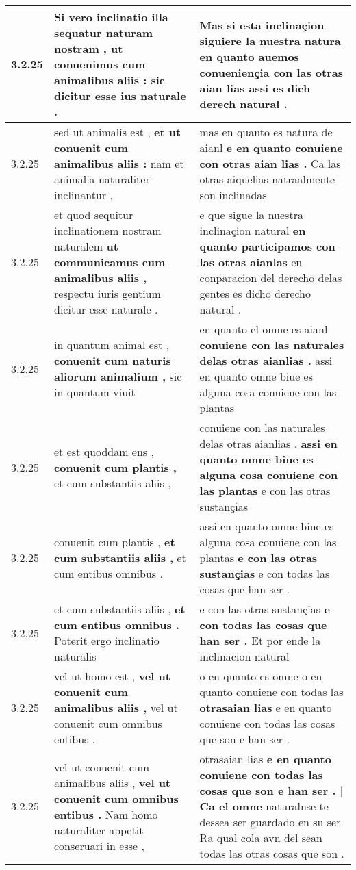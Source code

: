 \begin{tabular}{|p{1cm}|p{6.5cm}|p{6.5cm}|}
3.2.25 & Si vero inclinatio illa sequatur naturam nostram , \textbf{ ut conuenimus cum animalibus aliis : } sic dicitur esse ius naturale . & Mas si esta inclinaçion \textbf{ siguiere la nuestra natura en quanto auemos conueniençia con las otras aian lias } assi es dich derech natural . \\\hline
3.2.25 & sed ut animalis est , \textbf{ et ut conuenit cum animalibus aliis : } nam et animalia naturaliter inclinantur , & mas en quanto es natura de aianl \textbf{ e en quanto conuiene con otras aian lias . } Ca las otras aiquelias natraalmente son inclinadas \\\hline
3.2.25 & et quod sequitur inclinationem nostram naturalem \textbf{ ut communicamus cum animalibus aliis , } respectu iuris gentium dicitur esse naturale . & e que sigue la nuestra inclinaçion natural \textbf{ en quanto participamos con las otras aianlas } en conparacion del derecho delas gentes es dicho derecho natural . \\\hline
3.2.25 & in quantum animal est , \textbf{ conuenit cum naturis aliorum animalium , } sic in quantum viuit & en quanto el omne es aianl \textbf{ conuiene con las naturales delas otras aianlias . } assi en quanto omne biue es alguna cosa conuiene con las plantas \\\hline
3.2.25 & et est quoddam ens , \textbf{ conuenit cum plantis , } et cum substantiis aliis , & conuiene con las naturales delas otras aianlias . \textbf{ assi en quanto omne biue es alguna cosa conuiene con las plantas } e con las otras sustançias \\\hline
3.2.25 & conuenit cum plantis , \textbf{ et cum substantiis aliis , } et cum entibus omnibus . & assi en quanto omne biue es alguna cosa conuiene con las plantas \textbf{ e con las otras sustançias } e con todas las cosas que han ser . \\\hline
3.2.25 & et cum substantiis aliis , \textbf{ et cum entibus omnibus . } Poterit ergo inclinatio naturalis & e con las otras sustançias \textbf{ e con todas las cosas que han ser . } Et por ende la inclinacion natural \\\hline
3.2.25 & vel ut homo est , \textbf{ vel ut conuenit cum animalibus aliis , } vel ut conuenit cum omnibus entibus . & o en quanto es omne o en quanto conuiene con todas las \textbf{ otrasaian lias } e en quanto conuiene con todas las cosas que son e han ser . \\\hline
3.2.25 & vel ut conuenit cum animalibus aliis , \textbf{ vel ut conuenit cum omnibus entibus . } Nam homo naturaliter appetit conseruari in esse , & otrasaian lias \textbf{ e en quanto conuiene con todas las cosas que son e han ser . | Ca el omne } naturalnse te dessea ser guardado en su ser Ra qual cola avn del sean todas las otras cosas que son . \\\hline

\end{tabular}
